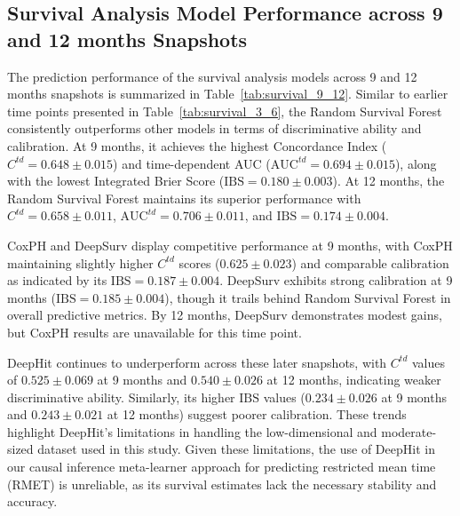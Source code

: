 
\subsection{Survival Analysis Model Performance across 9 and 12 months Snapshots}
\label{apd:survival_analysis}

The prediction performance of the survival analysis models across 9 and 12 months snapshots is summarized in Table~\ref{tab:survival_9_12}.
Similar to earlier time points presented in Table~\ref{tab:survival_3_6}, the Random Survival Forest consistently outperforms other models in terms of discriminative ability and calibration.
At 9 months, it achieves the highest Concordance Index (\(C^{td} = 0.648 \pm 0.015\)) and time-dependent AUC (\(\text{AUC}^{td} = 0.694 \pm 0.015\)), along with the lowest Integrated Brier Score (\(\text{IBS} = 0.180 \pm 0.003\)).
At 12 months, the Random Survival Forest maintains its superior performance with \(C^{td} = 0.658 \pm 0.011\), \(\text{AUC}^{td} = 0.706 \pm 0.011\), and \(\text{IBS} = 0.174 \pm 0.004\).

CoxPH and DeepSurv display competitive performance at 9 months, with CoxPH maintaining slightly higher \(C^{td}\) scores (\(0.625 \pm 0.023\)) and comparable calibration as indicated by its \(\text{IBS} = 0.187 \pm 0.004\).
DeepSurv exhibits strong calibration at 9 months (\(\text{IBS} = 0.185 \pm 0.004\)), though it trails behind Random Survival Forest in overall predictive metrics.
By 12 months, DeepSurv demonstrates modest gains, but CoxPH results are unavailable for this time point.

DeepHit continues to underperform across these later snapshots, with \(C^{td}\) values of \(0.525 \pm 0.069\) at 9 months and \(0.540 \pm 0.026\) at 12 months, indicating weaker discriminative ability.
Similarly, its higher \(\text{IBS}\) values (\(0.234 \pm 0.026\) at 9 months and \(0.243 \pm 0.021\) at 12 months) suggest poorer calibration.
These trends highlight DeepHit's limitations in handling the low-dimensional and moderate-sized dataset used in this study.
Given these limitations, the use of DeepHit in our causal inference meta-learner approach for predicting restricted mean time (RMET) is unreliable, as its survival estimates lack the necessary stability and accuracy.

